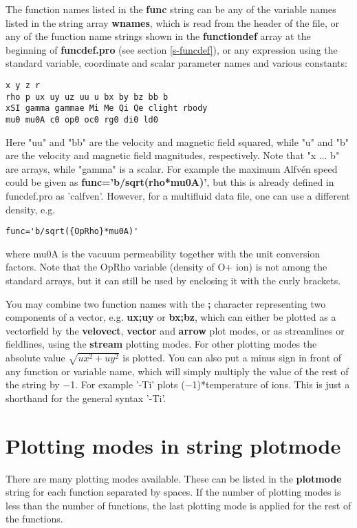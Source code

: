 \documentclass{article}
\begin{document}
The function names listed in the {\bf func} string can be any of 
the variable names listed in the string array {\bf wnames}, which is 
read from the header of the file, or any of the function name strings 
shown in the {\bf functiondef} array at the beginning of
{\bf funcdef.pro} (see section \ref{s-funcdef}), 
or any expression using the standard variable, 
coordinate and scalar parameter names and various constants:
\begin{verbatim}
x y z r
rho p ux uy uz uu u bx by bz bb b
xSI gamma gammae Mi Me Qi Qe clight rbody
mu0 mu0A c0 op0 oc0 rg0 di0 ld0
\end{verbatim}
Here "uu" and "bb" are the velocity and magnetic field squared, while
"u" and "b" are the velocity and magnetic field magnitudes, 
respectively. Note that "x ... b" are arrays, while  "gamma" is
a scalar.  For example the maximum Alfv\'en 
speed could be given as {\bf func='b/sqrt(rho*mu0A)'}, but this is already 
defined in funcdef.pro as 'calfven'. However, for a multifluid data
file, one can use a different density, e.g. 
\begin{verbatim}
func='b/sqrt({OpRho}*mu0A)'
\end{verbatim}
where mu0A is the vacuum permeability together with the unit conversion
factors.
Note that the OpRho variable (density of O+ ion) is not among the standard
arrays, but it can still be used by enclosing it with the curly brackets.

You may combine two function names with the {\bf ;} character representing
two components of a vector, 
e.g. {\bf ux;uy} or {\bf bx;bz}, which can either be plotted as a 
vectorfield by the {\bf velovect}, {\bf vector} and {\bf arrow} plot modes, 
or as streamlines or fieldlines, using the {\bf stream} plotting modes.
For other plotting modes the absolute value
$\sqrt{ux^2+uy^2}$ is plotted.
You can also put a minus sign in front of any function or variable
name, which will simply multiply the value of the rest of the string by $-$1. 
For example '-Ti' plots ($-$1)*temperature of ions. This is just a shorthand for
the general syntax '-{Ti}'.

\section{Plotting modes in string plotmode \label{s-plotmode}}

There are many plotting modes available. 
These can be listed in the {\bf plotmode} string for each function separated 
by spaces. If the number of plotting modes is less than the number of functions,
the last plotting mode is applied for the rest of the functions.
\end{document}

